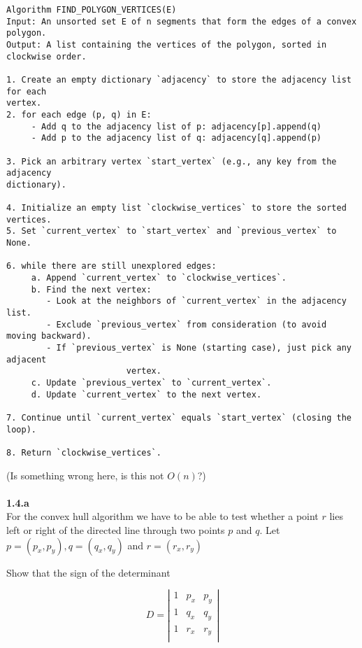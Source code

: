 \begin{verbatim}
Algorithm FIND_POLYGON_VERTICES(E)
Input: An unsorted set E of n segments that form the edges of a convex polygon.
Output: A list containing the vertices of the polygon, sorted in clockwise order.

1. Create an empty dictionary `adjacency` to store the adjacency list for each
vertex.
2. for each edge (p, q) in E:
     - Add q to the adjacency list of p: adjacency[p].append(q)
     - Add p to the adjacency list of q: adjacency[q].append(p)

3. Pick an arbitrary vertex `start_vertex` (e.g., any key from the adjacency
dictionary).

4. Initialize an empty list `clockwise_vertices` to store the sorted vertices.
5. Set `current_vertex` to `start_vertex` and `previous_vertex` to None.

6. while there are still unexplored edges:
     a. Append `current_vertex` to `clockwise_vertices`.
     b. Find the next vertex:
        - Look at the neighbors of `current_vertex` in the adjacency list.
        - Exclude `previous_vertex` from consideration (to avoid moving backward).
        - If `previous_vertex` is None (starting case), just pick any adjacent
						vertex.
     c. Update `previous_vertex` to `current_vertex`.
     d. Update `current_vertex` to the next vertex.

7. Continue until `current_vertex` equals `start_vertex` (closing the loop).

8. Return `clockwise_vertices`.
\end{verbatim}

(Is something wrong here, is this not $O(n)$?)
\\\\
\noindent
\textbf{1.4.a}\\
\noindent
For the convex hull algorithm we have to be able to test whether a point $r$ lies left or right of the directed line through two points $p$ and $q$. Let $p = (p_{x}, p_{y}), q = (q_{x}, q_{y})$ and $r = (r_{x}, r_{y})$

Show that the sign of the determinant

\begin{equation}
	D = \left| \begin{array}{ccc}
		1 & p_x & p_y \\
		1 & q_x & q_y \\
		1 & r_x & r_y \\
	\end{array} \right|
\end{equation}

